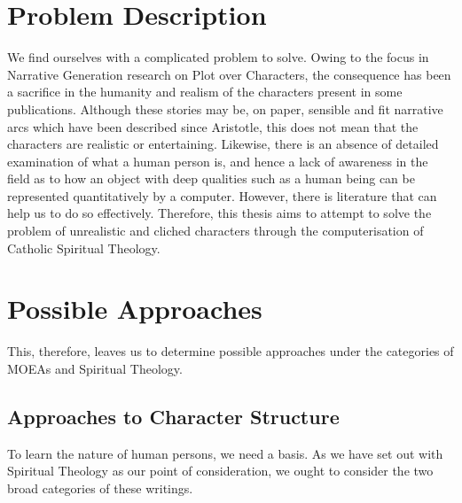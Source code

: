 \documentclass[11pt]{article}
\begin{document}
\section{Problem Description}
We find ourselves with a complicated problem to solve. Owing to the focus in Narrative Generation research on Plot over Characters, the consequence has been a sacrifice in the humanity and realism of the characters present in some publications. Although these stories may be, on paper, sensible and fit narrative arcs which have been described since Aristotle, this does not mean that the characters are realistic or entertaining. Likewise, there is an absence of detailed examination of what a human person is, and hence a lack of awareness in the field as to how an object with deep qualities such as a human being can be represented quantitatively by a computer. However, there is literature that can help us to do so effectively. Therefore, this thesis aims to attempt to solve the problem of unrealistic and cliched characters through the computerisation of Catholic Spiritual Theology.\\

\section{Possible Approaches}
This, therefore, leaves us to determine possible approaches under the categories of MOEAs and Spiritual Theology.\\
\subsection{Approaches to Character Structure}
To learn the nature of human persons, we need a basis. As we have set out with Spiritual Theology as our point of consideration, we ought to consider the two broad categories of these writings.\\
\end{document}

